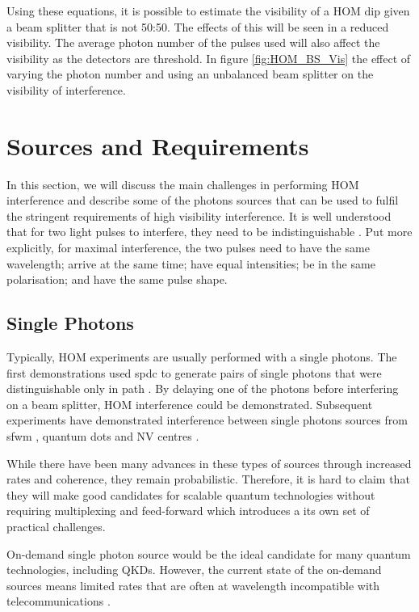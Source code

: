 Using these equations, it is possible to estimate the visibility of a HOM dip given a beam splitter that is not 50:50. The effects of this will be seen in a reduced visibility. The average photon number of the pulses used will also affect the visibility as the detectors are threshold. In figure \ref{fig:HOM_BS_Vis} the effect of varying the photon number and using an unbalanced beam splitter on the visibility of interference.

\section{Sources and Requirements}
\label{sec:sources}

In this section, we will discuss the main challenges in performing \ac{HOM} interference and describe some of the photons sources that can be used to fulfil the stringent requirements of high visibility interference. It is well understood that for two light pulses to interfere, they need to be indistinguishable \cite{}. Put more explicitly, for maximal interference, the two pulses need to have the same wavelength; arrive at the same time; have equal intensities; be in the same polarisation; and have the same pulse shape.

\subsection{Single Photons}

Typically, \acl{HOM} experiments are usually performed with a single photons. The first demonstrations used \ac{spdc} to generate pairs of single photons that were distinguishable only in path \cite{}. By delaying one of the photons before interfering on a beam splitter, \ac{HOM} interference could be demonstrated. Subsequent experiments have demonstrated interference between single photons sources from \ac{sfwm} \cite{}, quantum dots \cite{} and NV centres \cite{}.

While there have been many advances in these types of sources through increased rates and coherence, they remain probabilistic. Therefore, it is hard to claim that they will make good candidates for scalable quantum technologies without requiring multiplexing and feed-forward which introduces a its own set of practical challenges.

On-demand single photon source would be the ideal candidate for many quantum technologies, including \acp{QKD}. However, the current state of the on-demand sources means limited rates that are often at wavelength incompatible with telecommunications \cite{}. 

